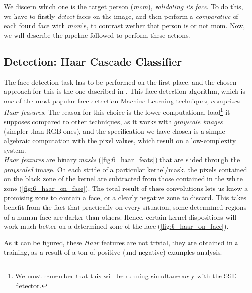 	We discern which one is the target person (\emph{mom}), \emph{validating its face}. To do this, we have to firstly \emph{detect} faces on the image, and then perform a \emph{comparative} of each found face with \emph{mom}'s, to contrast wether that person is or not mom. Now, we will describe the pipeline followed to perform these actions.
	
	\subsection{Detection: Haar Cascade Classifier}
	
		The face detection task has to be performed on the first place, and the chosen approach for this is the one described in \cite{cawadallah}. This face detection algorithm, which is one of the most popular face detection Machine Learning techniques, comprises \emph{Haar features}. The reason for this choice is the lower computational load\footnote{We must remember that this will be running simultaneously with the SSD detector.} it supposes compared to other techniques, as it works with \emph{grayscale images} (simpler than RGB ones), and the specification we have chosen is a simple algebraic computation with the pixel values, which result on a low-complexity system.\\
		
		\emph{Haar features} are binary \emph{masks} (\autoref{fig:6_haar_feats}) that are slided through the \emph{grayscaled} image. On each stride of a particular kernel/mask, the pixels contained on the black zone of the kernel are subtracted from those contained in the white zone (\autoref{fig:6_haar_on_face}). The total result of these convolutions lets us know a promising zone to contain a face, or a clearly negative zone to discard. This takes benefit from the fact that practically on every situation, some determined regions of a human face are darker than others. Hence, certain kernel dispositions will work much better on a determined zone of the face (\autoref{fig:6_haar_on_face}).
		
		As it can be figured, these \emph{Haar} features are not trivial, they are obtained in a training, as a result of a ton of positive (and negative) examples analysis.\\
	
